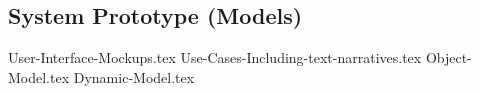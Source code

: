 \newpage
\subsection{System Prototype (Models)}
{User-Interface-Mockups.tex}
{Use-Cases-Including-text-narratives.tex}
{Object-Model.tex}
{Dynamic-Model.tex}
